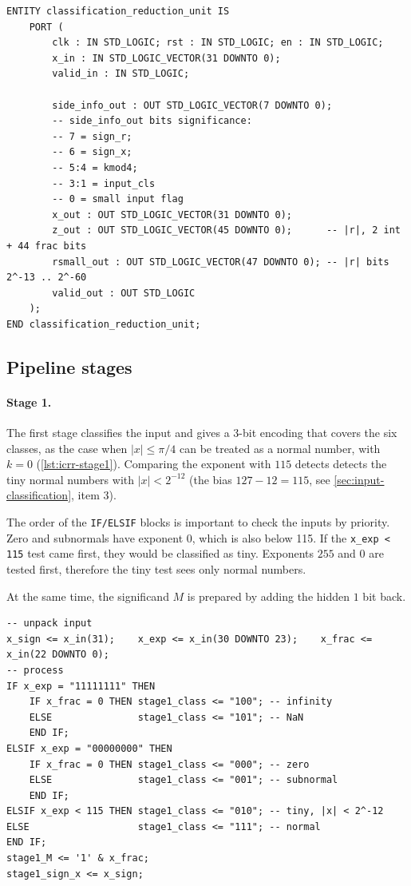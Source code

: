 \begin{lstlisting}[caption = {Input classification and range reduction entity declaration}, label = {lst:classification_reduction_unit}]
ENTITY classification_reduction_unit IS
    PORT (
        clk : IN STD_LOGIC; rst : IN STD_LOGIC; en : IN STD_LOGIC;
        x_in : IN STD_LOGIC_VECTOR(31 DOWNTO 0);
        valid_in : IN STD_LOGIC;

        side_info_out : OUT STD_LOGIC_VECTOR(7 DOWNTO 0);
        -- side_info_out bits significance:
        -- 7 = sign_r;
        -- 6 = sign_x;
        -- 5:4 = kmod4;
        -- 3:1 = input_cls
        -- 0 = small input flag
        x_out : OUT STD_LOGIC_VECTOR(31 DOWNTO 0);
        z_out : OUT STD_LOGIC_VECTOR(45 DOWNTO 0);      -- |r|, 2 int + 44 frac bits
        rsmall_out : OUT STD_LOGIC_VECTOR(47 DOWNTO 0); -- |r| bits 2^-13 .. 2^-60
        valid_out : OUT STD_LOGIC
    );
END classification_reduction_unit;
\end{lstlisting}

\subsection{Pipeline stages}
\label{subsec:icrr-stages}

\paragraph{Stage 1.}
The first stage classifies the input and gives a 3-bit encoding that covers the six
classes, as the case when $|x| \le \pi/4$ can be treated as a normal number, with $k = 0$
(\cref{lst:icrr-stage1}). Comparing the exponent with $115$ detects detects the tiny normal numbers
with $ |x| < 2^{-12}$ (the bias $127 - 12 = 115$, see \cref{sec:input-classification}, item 3).

The order of the \texttt{IF/ELSIF} blocks is important to check the inputs by priority.
Zero and subnormals have exponent $0$, which is also below 115.
If the \lstinline|x_exp < 115| test came first, they would be classified as tiny.
Exponents $255$ and $0$ are tested first, therefore the tiny test sees only normal numbers.

At the same time, the significand $M$ is prepared by adding the hidden $1$ bit back.

\begin{lstlisting}[caption = {First stage -- classification process logic}, label = {lst:icrr-stage1}]
-- unpack input
x_sign <= x_in(31);    x_exp <= x_in(30 DOWNTO 23);    x_frac <= x_in(22 DOWNTO 0);
-- process
IF x_exp = "11111111" THEN
    IF x_frac = 0 THEN stage1_class <= "100"; -- infinity
    ELSE               stage1_class <= "101"; -- NaN
    END IF;
ELSIF x_exp = "00000000" THEN
    IF x_frac = 0 THEN stage1_class <= "000"; -- zero
    ELSE               stage1_class <= "001"; -- subnormal
    END IF;
ELSIF x_exp < 115 THEN stage1_class <= "010"; -- tiny, |x| < 2^-12
ELSE                   stage1_class <= "111"; -- normal
END IF;
stage1_M <= '1' & x_frac;
stage1_sign_x <= x_sign;
\end{lstlisting}

